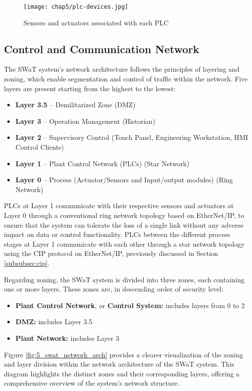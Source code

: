 \begin{figure}[ht]
	\centering
	\texttt{[image: chap5/plc-devices.jpg]}
	\caption{Sensors and actuators associated with each PLC}
	\label{fig:5_swat_sensors_plc}
\end{figure}

\subsection{Control and Communication Network}
\label{subsec:5_swat_network_architecture}
The SWaT system's network architecture follows the principles of layering and zoning, which enable segmentation and control of traffic within the network.
\newline \newline
Five layers are present starting from the highest to the lowest: 

\begin{itemize}
	\item \textbf{Layer 3.5} -- Demilitarized Zone (DMZ)
	\item \textbf{Layer 3} -- Operation Management (Historian)
	\item \textbf{Layer 2} -- Supervisory Control (Touch Panel, Engineering Workstation, HMI Control Clients)
	\item \textbf{Layer 1} -- Plant Control Network (PLCs) (Star Network)
	\item \textbf{Layer 0} -- Process (Actuator/Sensors and Input/output modules) (Ring Network)
\end{itemize}
PLCs at Layer 1 communicate with their respective sensors and actuators at Layer 0 through a conventional ring network topology based on EtherNet/IP, to ensure that the system can tolerate the loss of a single link without any adverse impact on data or control functionality.\newline
PLCs between the different process stages at Layer 1 communicate with each other through a star network topology using the CIP protocol on EtherNet/IP, previously discussed in Section \ref{subsubsec:cip}.

\bigskip
Regarding zoning, the SWaT system is divided into three zones, each containing one or more layers. These zones are, in descending order of security level: 

\begin{itemize}
	\item \textbf{Plant Control Network}, or \textbf{Control System:} includes layers from 0 to 2
	\item \textbf{DMZ:} includes Layer 3.5
	\item \textbf{Plant Network:} includes Layer 3
\end{itemize}
Figure \ref{fig:5_swat_network_arch} provides a clearer visualization of the zoning and layer division within the network architecture of the SWaT system. This diagram highlights the distinct zones and their corresponding layers, offering a comprehensive overview of the system's network structure.


